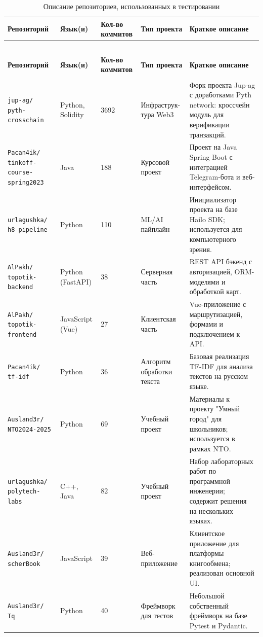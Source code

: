 \begin{longtable}{|p{3.5cm}|p{2.2cm}|p{2cm}|p{3cm}|p{4.5cm}|}
	\caption{Описание репозиториев, использованных в тестировании}
	\label{tab:test_repos} \\
	\hline
	\textbf{Репозиторий} & \textbf{Язык(и)} & \textbf{Кол-во коммитов} & \textbf{Тип проекта} & \textbf{Краткое описание} \\
	\hline
	\endfirsthead
	
	\multicolumn{5}{c}{{\tablename\ \thetable{}}} \\
	\hline
	\textbf{Репозиторий} & \textbf{Язык(и)} & \textbf{Кол-во коммитов} & \textbf{Тип проекта} & \textbf{Краткое описание} \\
	\hline
	\endhead
	
	\hline \multicolumn{5}{r}{{}} \\
	\endfoot
	
	\hline
	\endlastfoot
	
	\texttt{jup-ag/
		pyth-
		crosschain} & Python, Solidity & 3692 & Инфраструк-
	тура Web3 & Форк проекта Jup-ag с доработками Pyth network: кроссчейн модуль для верификации транзакций. \\
	\hline
	\texttt{Pacan4ik/
		tinkoff-course-
		spring2023} & Java & 188 & Курсовой проект & Проект на Java Spring Boot с интеграцией Telegram-бота и веб-интерфейсом. \\
	\hline
	\texttt{urlagushka/
		h8-pipeline} & Python & 110 & ML/AI пайплайн & Инициализатор проекта на базе Hailo SDK; используется для компьютерного зрения. \\
	\hline
	\texttt{AlPakh/
		topotik-
		backend} & Python (FastAPI) & 38 & Серверная часть & REST API бэкенд с авторизацией, ORM-моделями и обработкой карт. \\
	\hline
	\texttt{AlPakh/
		topotik-
		frontend} & JavaScript (Vue) & 27 & Клиентская часть & Vue-приложение с маршрутизацией, формами и подключением к API. \\
	\hline
	\texttt{Pacan4ik/
		tf-idf} & Python & 36 & Алгоритм обработки текста & Базовая реализация TF-IDF для анализа текстов на русском языке. \\
	\hline
	\texttt{Ausland3r/
		NTO2024-2025} & Python & 69 & Учебный проект & Материалы к проекту "Умный город" для школьников; используется в рамках NTO. \\
	\hline
	\texttt{urlagushka/
		polytech-labs} & C++, Java & 82 & Учебный проект & Набор лабораторных работ по программной инженерии; содержит решения на нескольких языках. \\
	\hline
	\texttt{Ausland3r/
		scherBook} & JavaScript & 39 & Веб-приложение & Клиентское приложение для платформы книгообмена; реализован основной UI. \\
	\hline
	\texttt{Ausland3r/
		Tq} & Python & 40 & Фреймворк для тестов & Небольшой собственный фреймворк на базе Pytest и Pydantic. \\
\end{longtable}

